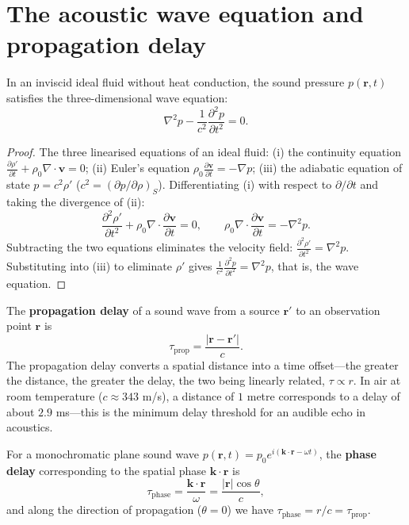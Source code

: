 \section{The acoustic wave equation and propagation delay}

\begin{theorem}\label{thm:acoustic_wave_equation}
In an inviscid ideal fluid without heat conduction, the sound pressure $p(\mathbf{r}, t)$ satisfies the three-dimensional wave equation:
\[
\boxed{\nabla^2 p - \frac{1}{c^2} \frac{\partial^2 p}{\partial t^2} = 0}.
\]
\end{theorem}

\begin{proof}
The three linearised equations of an ideal fluid: (i) the continuity equation $\frac{\partial \rho'}{\partial t} + \rho_0 \nabla\cdot\mathbf{v} = 0$; (ii) Euler's equation $\rho_0 \frac{\partial \mathbf{v}}{\partial t} = -\nabla p$; (iii) the adiabatic equation of state $p = c^2 \rho'$ ($c^2 = (\partial p/\partial\rho)_S$). Differentiating (i) with respect to $\partial/\partial t$ and taking the divergence of (ii):
\[
\frac{\partial^2 \rho'}{\partial t^2} + \rho_0 \nabla\cdot\frac{\partial \mathbf{v}}{\partial t} = 0, \qquad
\rho_0 \nabla\cdot\frac{\partial \mathbf{v}}{\partial t} = -\nabla^2 p.
\]
Subtracting the two equations eliminates the velocity field: $\frac{\partial^2 \rho'}{\partial t^2} = \nabla^2 p$. Substituting into (iii) to eliminate $\rho'$ gives $\frac{1}{c^2}\frac{\partial^2 p}{\partial t^2} = \nabla^2 p$, that is, the wave equation.
\end{proof}

\begin{definition}\label{def:acoustic_propagation_delay}
The \textbf{propagation delay} of a sound wave from a source $\mathbf{r}'$ to an observation point $\mathbf{r}$ is
\[
\tau_{\text{prop}} = \frac{|\mathbf{r} - \mathbf{r}'|}{c}.
\]
The propagation delay converts a spatial distance into a time offset---the greater the distance, the greater the delay, the two being linearly related, $\tau \propto r$. In air at room temperature ($c \approx 343$ m/s), a distance of $1$ metre corresponds to a delay of about $2.9$ ms---this is the minimum delay threshold for an audible echo in acoustics.
\end{definition}

\begin{definition}\label{def:acoustic_phase_delay}
For a monochromatic plane sound wave $p(\mathbf{r}, t) = p_0 e^{i(\mathbf{k}\cdot\mathbf{r} - \omega t)}$, the \textbf{phase delay} corresponding to the spatial phase $\mathbf{k}\cdot\mathbf{r}$ is
\[
\tau_{\text{phase}} = \frac{\mathbf{k}\cdot\mathbf{r}}{\omega} = \frac{|\mathbf{r}|\cos\theta}{c},
\]
and along the direction of propagation ($\theta=0$) we have $\tau_{\text{phase}} = r/c = \tau_{\text{prop}}$.
\end{definition}

